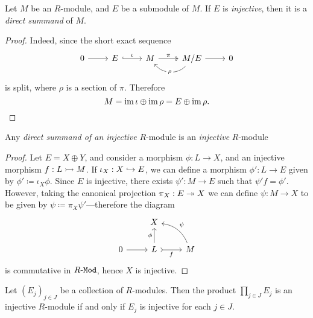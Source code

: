 \begin{corollary}
    \label{cor:injective-submodule-is-direct-summand}
    Let \(M\) be an \(R\)-module, and \(E\) be a submodule of \(M\). If \(E\) is
    \emph{injective}, then it is a \emph{direct summand} of \(M\).
\end{corollary}

\begin{proof}
    Indeed, since the short exact sequence
    \[
        \begin{tikzcd}
            0 \ar[r] &E \ar[r, hook, "\iota"] &M \ar[r, two heads, "\pi"]
            &M/E \ar[l, bend left=50, "\rho" description] \ar[r] &0
        \end{tikzcd}
    \]
    is split, where \(\rho\) is a section of \(\pi\). Therefore
    \[
        M = \operatorname{im} \iota \oplus \operatorname{im} \rho = E \oplus \operatorname{im} \rho.
    \]
\end{proof}

\begin{proposition}
    \label{prop:direct-summand-of-injective-is-injective}
    Any \emph{direct summand of an injective} \(R\)-module is an \emph{injective}
    \(R\)-module
\end{proposition}

\begin{proof}
    Let \(E = X \oplus Y\), and consider a morphism \(\phi: L \to X\), and an
    injective morphism \(f: L \rightarrowtail M\). If \(\iota_X: X \hookrightarrow E\), we can define a
    morphism \(\phi': L \to E\) given by \(\phi' \coloneq \iota_X \phi\). Since
    \(E\) is injective, there exists \(\psi': M \to E\) such that
    \(\psi' f = \phi'\). However, taking the canonical projection
    \(\pi_X: E \twoheadrightarrow X\) we can define \(\psi: M \to X\) to be given by
    \(\psi \coloneq \pi_X \psi'\)---therefore the diagram
    \[
        \begin{tikzcd}
            &X &
            \\
            0 \ar[r] &L \ar[u, "\phi"] \ar[r, tail, "f"'] &M \ar[lu, bend right, "\psi"']
        \end{tikzcd}
    \]
    is commutative in \({R\text{-}\texttt{Mod}}\), hence \(X\) is injective.
\end{proof}

\begin{proposition}
    \label{prop:module-product-injective-iff-collection-injective}
    Let \((E_j)_{j \in J}\) be a collection of \(R\)-modules. Then the product
    \(\prod_{j \in J} E_j\) is an injective \(R\)-module if and only if \(E_j\) is
    injective for each \(j \in J\).
\end{proposition}


